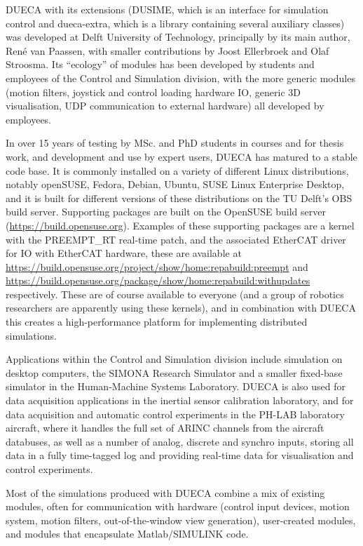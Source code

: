 \documentclass[11pt,a4paper,twoside]{scrreprt}
\begin{document}
DUECA with its extensions (DUSIME, which is an interface for simulation control and dueca-extra, which is a library containing several auxiliary classes) was developed at Delft University of Technology, principally by its main author, René van Paassen, with smaller contributions by Joost Ellerbroek and Olaf Stroosma. Its ``ecology'' of modules has been developed by students and employees of the Control and Simulation division, with the more generic modules (motion filters, joystick and control loading hardware IO, generic 3D visualisation, UDP communication to external hardware) all developed by employees.

In over 15 years of testing by MSc. and PhD students in courses and for thesis work, and development and use by expert users, DUECA has matured to a stable code base. It is commonly installed on a variety of different Linux distributions, notably openSUSE, Fedora, Debian, Ubuntu, SUSE Linux Enterprise Desktop, and it is built for different versions of these distributions on the TU Delft's OBS build server. Supporting packages are built on the OpenSUSE build server (\url{https://build.opensuse.org}). Examples of these supporting packages are a kernel with the PREEMPT\_RT real-time patch, and the associated EtherCAT driver for IO with EtherCAT hardware, these are available at \url{https://build.opensuse.org/project/show/home:repabuild:preempt} and \url{https://build.opensuse.org/package/show/home:repabuild:withupdates} respectively. These are of course available to everyone (and a group of robotics researchers are apparently using these kernels), and in combination with DUECA this creates a high-performance platform for implementing distributed simulations.

Applications within the Control and Simulation division include simulation on desktop computers, the SIMONA Research Simulator and a smaller fixed-base simulator in the Human-Machine Systems Laboratory. DUECA is also used for data acquisition applications in the inertial sensor calibration laboratory, and for data acquisition and automatic control experiments in the PH-LAB laboratory aircraft, where it handles the full set of ARINC channels from the aircraft databuses, as well as a number of analog, discrete and synchro inputs, storing all data in a fully time-tagged log and providing real-time data for visualisation and control experiments.

Most of the simulations produced with DUECA combine a mix of existing modules, often for communication with hardware (control input devices, motion system, motion filters, out-of-the-window view generation), user-created modules, and modules that encapsulate Matlab/SIMULINK code.
\end{document}
